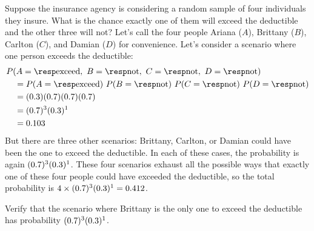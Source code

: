 \begin{examplewrap}
\begin{nexample}{Suppose the insurance agency is considering
    a random sample of four individuals they insure.
    What is the chance exactly one of them will exceed
    the deductible and the other three will not?
    Let's call the four people
    Ariana ($A$),
    Brittany ($B$),
    Carlton ($C$),
    and Damian ($D$)
    for convenience.}
  \label{insureOneOfFourExceedsDeductible}%
  Let's consider a scenario where one person exceeds
  the deductible:
  \begin{align*}
  &P(A=\text{\insureF{}},
      \text{ }B=\text{\insureS{}},
      \text{ }C=\text{\insureS{}},
      \text{ }D=\text{\insureS{}}) \\
    &\quad = P(A=\text{\insureF{}})\ 
        P(B=\text{\insureS{}})\ 
        P(C=\text{\insureS{}})\ 
        P(D=\text{\insureS{}}) \\
    &\quad =  (\insureFprob{})
        (\insureSprob{})
        (\insureSprob{})
        (\insureSprob{}) \\
    &\quad = (\insureSprob{})^3 (\insureFprob{})^1 \\
    &\quad = \insureBinomCinDSingleScenario{}
  \end{align*}
  But there are three other scenarios: Brittany, Carlton,
  or Damian could have been the one to exceed the deductible.
  In each of these cases, the probability is again
  $(0.7{})^3 (0.3{})^1$.
  These four scenarios exhaust all the possible ways that
  exactly one of these four people could have exceeded
  the deductible, so the total probability is
  $4 \times (0.7{})^3 (0.3{})^1
      = 0.412{}$.
\end{nexample}
\end{examplewrap}

\begin{exercisewrap}
\begin{nexercise}
Verify that the scenario where Brittany is the only one to exceed the deductible has probability
$(0.7{})^3 (0.3{})^1$.~\footnotemark{}
\end{nexercise}
\end{exercisewrap}


